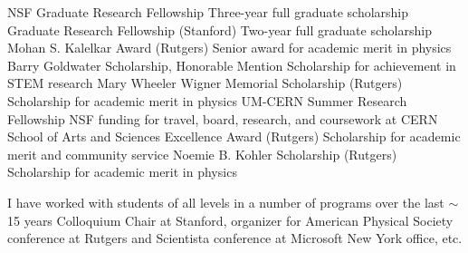     \cvachievement{\faGraduationCap}
                  {NSF Graduate Research Fellowship}
                  {Three-year full graduate scholarship}
    \cvachievement{\faGraduationCap}
                  {Graduate Research Fellowship (Stanford)}
                  {Two-year full graduate scholarship}
    \cvachievement{\faGraduationCap}
                  {Mohan S. Kalelkar Award (Rutgers)}
                  {Senior award for academic merit in physics}
    \cvachievement{\faThumbsUp}
                  {Barry Goldwater Scholarship, Honorable Mention}
                  {Scholarship for achievement in STEM research}
    \cvachievement{\faGraduationCap}
                  {Mary Wheeler Wigner Memorial Scholarship (Rutgers)}
                  {Scholarship for academic merit in physics}
    \cvachievement{\faGraduationCap}
                  {UM-CERN Summer Research Fellowship}
                  {NSF funding for travel, board, research, and coursework at CERN}
    \cvachievement{\faGraduationCap}
                  {School of Arts and Sciences Excellence Award (Rutgers)}
                  {Scholarship for academic merit and community service}
    \cvachievement{\faGraduationCap}
                  {Noemie B. Kohler Scholarship (Rutgers)}
                  {Scholarship for academic merit in physics}



        {}
        {}
        {}
        {I have worked with students of all levels in a number of programs over the last $\sim$15 years}
        {}
        {}
        {}
        {Colloquium Chair at Stanford, organizer for American Physical Society conference at Rutgers and Scientista conference at Microsoft New York office, etc.}
